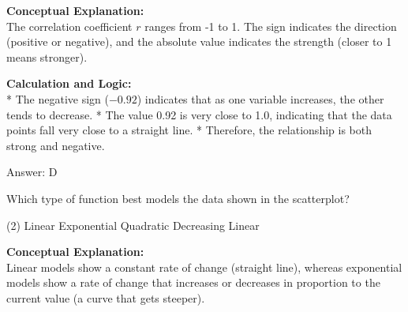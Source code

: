 \documentclass[11pt,paper=a4,answers]{exam}
\begin{document}
\begin{questions}
\begin{solution}
\textbf{Conceptual Explanation:} \\
The correlation coefficient $r$ ranges from -1 to 1. The sign indicates the direction (positive or negative), and the absolute value indicates the strength (closer to 1 means stronger).

\vspace{30pt}

\textbf{Calculation and Logic:} \\
* The negative sign ($-0.92$) indicates that as one variable increases, the other tends to decrease.
* The value 0.92 is very close to 1.0, indicating that the data points fall very close to a straight line.
* Therefore, the relationship is both strong and negative.

\vspace{30pt}

Answer: \colorbox{yellow!100}{D}
\end{solution}

\vspace{60pt}

\question
\begin{center}
\end{center}
Which type of function best models the data shown in the scatterplot?
\begin{tasks}(2)
    \task Linear
    \task Exponential
    \task Quadratic
    \task Decreasing Linear
\end{tasks}

\begin{solution}
\textbf{Conceptual Explanation:} \\
Linear models show a constant rate of change (straight line), whereas exponential models show a rate of change that increases or decreases in proportion to the current value (a curve that gets steeper).

\vspace{30pt}


\end{solution}
\end{questions}
\end{document}
